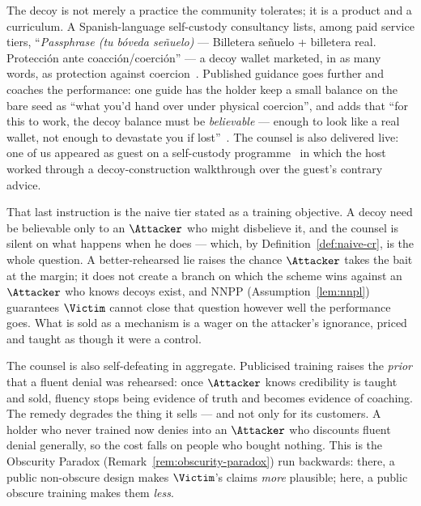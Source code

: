\begin{remark}\label{rem:decoy-market}
The decoy is not merely a practice the community tolerates; it is a product and a
curriculum. A Spanish-language self-custody consultancy lists, among paid service
tiers, ``\emph{Passphrase (tu b\'oveda se\~nuelo)} --- Billetera se\~nuelo +
billetera real. Protecci\'on ante coacci\'on/coerci\'on'' --- a decoy wallet
marketed, in as many words, as protection against coercion~\cite{tlt-servicios}.
Published guidance goes further and coaches the performance: one guide has the
holder keep a small balance on the bare seed as ``what you'd hand over under
physical coercion'', and adds that ``for this to work, the decoy balance must be
\emph{believable} --- enough to look like a real wallet, not enough to devastate
you if lost''~\cite{bsg-passphrase}.\ifanon\else{} The counsel is also delivered
live: one of us appeared as guest on a self-custody
programme~\cite{ong-autocustodia} in which the host worked through a
decoy-construction walkthrough over the guest's contrary advice.\fi

That last instruction is the naive tier stated as a training objective. A decoy
need be believable only to an $\Attacker$ who might disbelieve it, and the
counsel is silent on what happens when he does --- which, by
Definition~\ref{def:naive-cr}, is the whole question. A better-rehearsed lie
raises the chance $\Attacker$ takes the bait at the margin; it does not create a
branch on which the scheme wins against an $\Attacker$ who knows decoys exist,
and NNPP (Assumption~\ref{lem:nnpl}) guarantees $\Victim$ cannot close that
question however well the performance goes. What is sold as a mechanism is a
wager on the attacker's ignorance, priced and taught as though it were a control.

The counsel is also self-defeating in aggregate. Publicised training raises the
\emph{prior} that a fluent denial was rehearsed: once $\Attacker$ knows credibility
is taught and sold, fluency stops being evidence of truth and becomes evidence of
coaching. The remedy degrades the thing it sells --- and not only for its
customers. A holder who never trained now denies into an $\Attacker$ who discounts
fluent denial generally, so the cost falls on people who bought nothing. This is
the Obscurity Paradox (Remark~\ref{rem:obscurity-paradox}) run backwards: there, a
public non-obscure design makes $\Victim$'s claims \emph{more} plausible; here, a
public obscure training makes them \emph{less}.
\end{remark}

